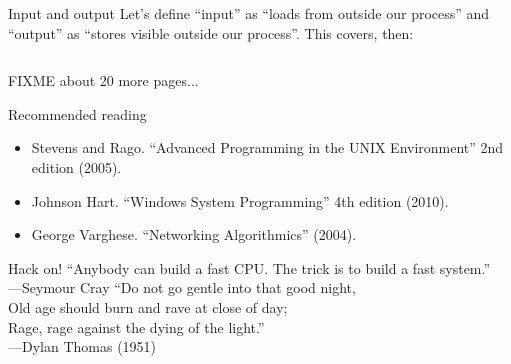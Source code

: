 \documentclass[mathserif,xcolor={dvipsnames,table}]{beamer}
\begin{document}
\begin{frame}{Input and output}
Let's define ``input'' as ``loads from outside our process'' and
``output'' as ``stores visible outside our process''.
\vfill
This covers, then:
\begin{columns}
\begin{column}{.5\textwidth}
\end{column}
\begin{column}{.5\textwidth}
\end{column}
\end{columns}
\end{frame}

\begin{frame}
\huge FIXME about 20 more pages...
\end{frame}

\begin{frame}{Recommended reading}
\footnotesize{
\begin{itemize}
\item Stevens and Rago. ``Advanced Programming in the UNIX Environment'' 2nd edition (2005).
\item Johnson Hart. ``Windows System Programming'' 4th edition (2010).
\item George Varghese. ``Networking Algorithmics'' (2004).
\end{itemize}
}
\end{frame}

\begin{frame}{Hack on!}
``Anybody can build a fast CPU. The trick is to build a fast system.''\\
\hfill---Seymour Cray
\vfill
``Do not go gentle into that good night,\\
Old age should burn and rave at close of day;\\
Rage, rage against the dying of the light.''\\
\hfill---Dylan Thomas (1951)
\end{frame}
\end{document}
